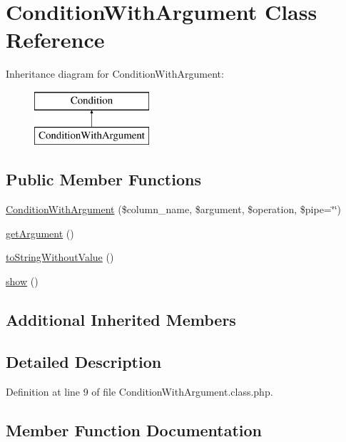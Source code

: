 \hypertarget{classConditionWithArgument}{}\section{Condition\+With\+Argument Class Reference}
\label{classConditionWithArgument}
Inheritance diagram for Condition\+With\+Argument\+:\begin{figure}[H]
\begin{center}
\leavevmode
\includegraphics[height=2.000000cm]{classConditionWithArgument}
\end{center}
\end{figure}
\subsection*{Public Member Functions}
\begin{DoxyCompactItemize}
\item 
\hyperlink{classConditionWithArgument_a2e5d396e44a1082e6a88ac52e8c5e63d}{Condition\+With\+Argument} (\$column\+\_\+name, \$argument, \$operation, \$pipe=\char`\"{}\char`\"{})
\item 
\hyperlink{classConditionWithArgument_a58a782b4a1f7eb6fd802f8b49750aeb7}{get\+Argument} ()
\item 
\hyperlink{classConditionWithArgument_adf2841f219b6bf3b96414c2c6100ce6c}{to\+String\+Without\+Value} ()
\item 
\hyperlink{classConditionWithArgument_a1624017983d96c85a7fc0b2a986b6e25}{show} ()
\end{DoxyCompactItemize}
\subsection*{Additional Inherited Members}


\subsection{Detailed Description}


Definition at line 9 of file Condition\+With\+Argument.\+class.\+php.



\subsection{Member Function Documentation}
\hypertarget{classConditionWithArgument_a2e5d396e44a1082e6a88ac52e8c5e63d}{}\label{classConditionWithArgument_a2e5d396e44a1082e6a88ac52e8c5e63d} 
